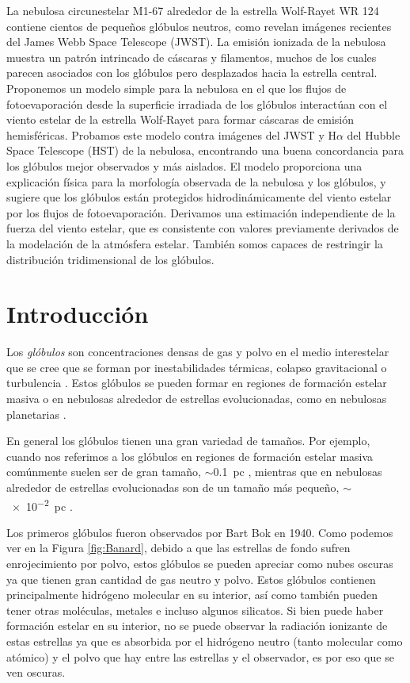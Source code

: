 \documentclass{book}
\begin{document}
La nebulosa circunestelar M1-67 alrededor de la estrella Wolf-Rayet WR 124 contiene cientos de pequeños glóbulos neutros, como revelan imágenes recientes del  James Webb Space Telescope (JWST). La emisión ionizada de la nebulosa muestra un patrón intrincado de cáscaras y filamentos, muchos de los cuales parecen asociados con los glóbulos pero desplazados hacia la estrella central. Proponemos un modelo simple para la nebulosa en el que los flujos de fotoevaporación desde la superficie irradiada de los glóbulos interactúan con el viento estelar de la estrella Wolf-Rayet para formar cáscaras de emisión hemisféricas. Probamos este modelo contra imágenes del JWST y H$\alpha$ del Hubble Space Telescope (HST) de la nebulosa, encontrando una buena concordancia para los glóbulos mejor observados y más aislados. El modelo proporciona una explicación física para la morfología observada de la nebulosa y los glóbulos, y sugiere que los glóbulos están protegidos hidrodinámicamente del viento estelar por los flujos de fotoevaporación. Derivamos una estimación independiente de la fuerza del viento estelar, que es consistente con valores previamente derivados de la modelación de la atmósfera estelar. También somos capaces de restringir la distribución tridimensional de los glóbulos.

\newpage

\tableofcontents

\newpage

\chapter{Introducción}\label{Capitulo 1:introduccion}

Los \textit{glóbulos} son concentraciones densas de gas y polvo en el medio interestelar que se cree que se forman por inestabilidades térmicas, colapso gravitacional o turbulencia \citep{Ballesteros:2011,Padoan:2002}. Estos glóbulos se pueden formar en regiones de formación estelar masiva o en nebulosas alrededor de estrellas evolucionadas, como en nebulosas planetarias \citep{O'Dell:2007}.

En general los glóbulos tienen una gran variedad de tamaños. Por ejemplo, cuando nos referimos a los glóbulos en regiones de formación estelar masiva comúnmente suelen ser de gran tamaño, $\sim$\SI{0.1}{pc} \citep{Schenider:2016}, mientras que en nebulosas alrededor de estrellas evolucionadas son de un tamaño más pequeño, $\sim$\SI{e-2}{pc} \citep{GFGahm:2013}.

Los primeros glóbulos fueron observados por Bart Bok en 1940. Como podemos ver en la Figura \ref{fig:Banard}, debido a que las estrellas de fondo sufren enrojecimiento por polvo, estos glóbulos se pueden apreciar como nubes oscuras ya que tienen gran cantidad de gas neutro y polvo. Estos glóbulos contienen principalmente hidrógeno molecular en su interior, así como también pueden tener otras moléculas, metales e incluso algunos silicatos. Si bien puede haber formación estelar en su interior, no se puede observar la radiación ionizante de estas estrellas ya que es absorbida por el hidrógeno neutro (tanto molecular como atómico) y el polvo que hay entre las estrellas y el observador, es por eso que se ven oscuras.
\end{document}
